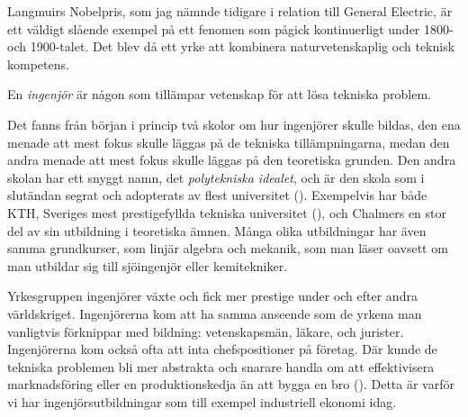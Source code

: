 Langmuirs Nobelpris, som jag nämnde tidigare i relation till General Electric, är ett väldigt slående exempel på ett fenomen som pågick kontinuerligt under 1800- och 1900-talet. Det blev då ett yrke att kombinera naturvetenskaplig och teknisk kompetens.
\begin{definition}
	En \emph{ingenjör} är någon som tillämpar vetenskap för att lösa tekniska problem. 
\end{definition}
Det fanns från början i princip två skolor om hur ingenjörer skulle bildas, den ena menade att mest fokus skulle läggas på de tekniska tillämpningarna, medan den andra menade att mest fokus skulle läggas på den teoretiska grunden. Den andra skolan har ett snyggt namn, det \emph{polytekniska idealet}, och är den skola som i slutändan segrat och adopterats av flest universitet (\cite[s.\ 243--249]{Sundin2006}). Exempelvis har både KTH, Sveriges mest prestigefyllda tekniska universitet (\cite[s.\ 75]{Berner2000}), och Chalmers en stor del av sin utbildning i teoretiska ämnen. Många olika utbildningar har även samma grundkurser, som linjär algebra och mekanik, som man läser oavsett om man utbildar sig till sjöingenjör eller kemitekniker. %

Yrkesgruppen ingenjörer växte och fick mer prestige under och efter andra världskriget. Ingenjörerna kom att ha samma anseende som de yrkena man vanligtvis förknippar med bildning: vetenskapsmän, läkare, och jurister. Ingenjörerna kom också ofta att inta chefspositioner på företag. Där kunde de tekniska problemen bli mer abstrakta och snarare handla om att effektivisera marknadsföring eller en produktionskedja än att bygga en bro (\cite[s.\ 249]{Sundin2006}). Detta är varför vi har ingenjörsutbildningar som till exempel industriell ekonomi idag.



